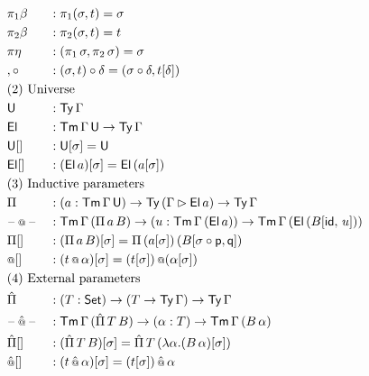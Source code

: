 \documentclass[a4paper,UKenglish,cleveref, autoref]{lipics-v2019}
\begin{document}
\begin{definition}
\begin{alignat*}{5}
  & {\pi_1\beta} && : \pi_1(\sigma, t) = \sigma \\
  & {\pi_2\beta} && : \pi_2(\sigma, t) = t \\
  & {\pi\eta} && : (\pi_1\,\sigma, \pi_2\,\sigma) = \sigma \\
  & {,\circ} && : (\sigma, t)\circ\delta = (\sigma\circ\delta, t[\delta]) \\
  & \rlap{(2) Universe} \\
  & \U && : \Ty\,\Gamma \\
  & \El && : \Tm\,\Gamma\,\U\ra\Ty\,\Gamma \\
  & {\U[]} && : \U[\sigma] = \U \\
  & {\El[]} && : (\El\,a)[\sigma] = \El\,(a[\sigma]) \\
  & \rlap{(3) Inductive parameters} \\
  & \Pi && : (a:\Tm\,\Gamma\,\U)\ra\Ty\,(\Gamma\ext\El\,a)\ra\Ty\,\Gamma \\
  & \blank\oldapp\blank && : \Tm\,\Gamma\,(\Pi\,a\,B)\ra (u : \Tm\,\Gamma\,(\El\,a))
  \ra \Tm\,\Gamma\,(\El\,(B[\id,\,u])) \\
  & {\Pi[]} && : (\Pi\,a\,B)[\sigma] = \Pi\,(a[\sigma])\,(B[\sigma\circ\p,\q]) \\
  & {\oldapp[]} && : (t\oldapp\alpha)[\sigma] = (t[\sigma])\mathop{\oldapp}(\alpha[\sigma]) \\
  & \rlap{(4) External parameters} \\
  & \Pim && : (T:\Set)\ra(T\ra\Ty\,\Gamma)\ra\Ty\,\Gamma \\
  & \blank\appm \blank && : \Tm\,\Gamma\,(\Pim\,T\,B)\ra(\alpha:T) \ra\Tm\,\Gamma\,(B\,\alpha) \\
  & {\Pim[]} && : (\Pim\,T\,B)[\sigma] = \Pim\,T\,(\lambda \alpha.(B\,\alpha)[\sigma]) \\
  & {\appm[]} && : (t\appm\alpha)[\sigma] = (t[\sigma])\mathop{\appm}\alpha
\end{alignat*}
\end{definition}
\end{document}
